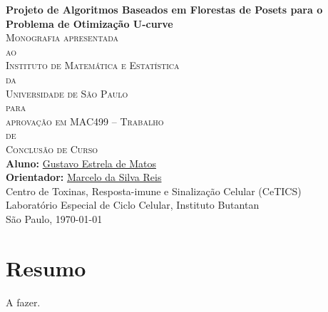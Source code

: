 \documentclass[12pt, twoside]{report}
\numberwithin{mydefinition}{section}
\numberwithin{mytheorem}{section}
\begin{document}
\thispagestyle{empty}
\begin{center}
{\Large
{\bf Projeto de Algoritmos Baseados em Florestas de Posets para o 
     Problema de Otimização U-curve}\\
\bigskip
\bigskip
\bigskip
\textsc{
    Monografia apresentada\\[-0.25cm] 
    ao\\[-0.25cm]
    Instituto de Matemática e Estatística\\[-0.25cm]
    da\\[-0.25cm]
    Universidade de São Paulo\\[-0.25cm]
    para\\[-0.25cm]
    aprovação em MAC499 -- Trabalho\\[-0.25cm]
    de\\[-0.25cm]
    Conclusão de Curso}\\
\bigskip
\bigskip
\bigskip
{\bf Aluno:} \href{mailto:gustavo.estrela.matos@gmail.com}{Gustavo Estrela de Matos}\\
\bigskip
{\bf Orientador:} \href{mailto:marcelo.reis@butantan.gov.br}{Marcelo da Silva Reis}\\
\bigskip
\bigskip
\bigskip
Centro de Toxinas, Resposta-imune e Sinalização Celular (CeTICS)\\
\bigskip
Laboratório Especial de Ciclo Celular, Instituto Butantan\\
\bigskip
\bigskip
\bigskip
São Paulo, \today
}
\end{center}
\newpage

\chapter*{Resumo}
A fazer.
\end{document}

